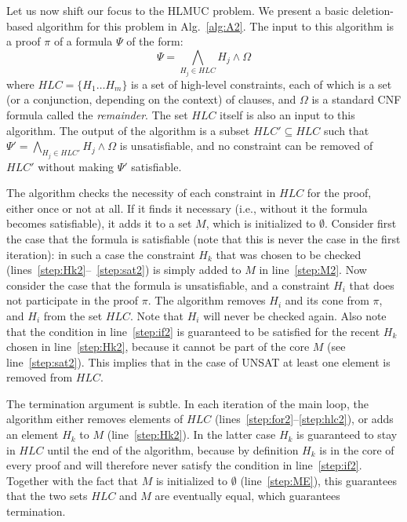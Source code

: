 \documentclass[twoside,11pt]{article}
\renewcommand\Pr{\pi}
\begin{document}
Let us now shift our focus to the HLMUC problem. We present a basic deletion-based algorithm for this problem
in Alg.~\ref{alg:A2}. The input to this algorithm is a proof $\Pr$ of a
formula $\Psi$ of the form:
\[\Psi = \bigwedge_{H_j\in HLC} H_j \land \Omega\]
where $HLC = \{H_1\ldots H_m\}$ is a set of high-level constraints, each of
which is a set (or a conjunction, depending on the context) of clauses, and
$\Omega$ is a standard CNF formula called the \emph{remainder}. The set $HLC$
itself is also an input to this algorithm. The output of the algorithm is a
subset $HLC' \subseteq HLC$ such that $\Psi' = \bigwedge_{H_j \in HLC'}H_j
\land \Omega$ is unsatisfiable, and no constraint can be removed of $HLC'$
without making $\Psi'$ satisfiable.

The algorithm checks the necessity of each constraint in $HLC$ for the proof,
either once or not at all. If it finds it necessary (i.e., without it the
formula becomes satisfiable), it adds it to a set $M$, which is initialized
to $\emptyset$. Consider first the case that the formula is satisfiable (note
that this is never the case in the first iteration): in such a case the
constraint $H_k$ that was chosen to be checked
(lines~\ref{step:Hk2}--~\ref{step:sat2}) is simply added to $M$ in
line~\ref{step:M2}. Now consider the case that the formula is unsatisfiable,
and a constraint $H_i$ that does not participate in the proof $\Pr$. The
algorithm removes $H_i$ and its cone from $\Pr$, and $H_i$ from
the set $HLC$. Note that $H_i$ will never be checked again. Also note that
the condition in line~\ref{step:if2} is guaranteed to be satisfied for the
recent $H_k$ chosen in line~\ref{step:Hk2}, because it cannot
be part of the core $M$ (see line~\ref{step:sat2}). This implies that in the case
of UNSAT at least one element is removed from $HLC$.

The termination argument is subtle. In each iteration of the main loop, the
algorithm either removes elements of $HLC$
(lines~\ref{step:for2}--\ref{step:hlc2}), or adds an element $H_k$ to $M$
(line~\ref{step:Hk2}). In the latter case $H_k$ is guaranteed to stay in
$HLC$ until the end of the algorithm, because by definition $H_k$ is in the
core of every proof and will therefore never satisfy the condition in
line~\ref{step:if2}. Together with the fact that $M$ is initialized to
$\emptyset$ (line~\ref{step:ME}), this guarantees that the two sets $HLC$ and
$M$ are eventually equal, which guarantees termination.

\end{document}
